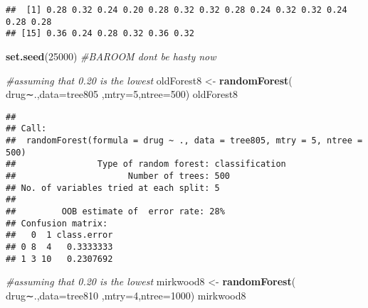 \documentclass[]{article}
\newenvironment{Shaded}{\begin{snugshade}}{\end{snugshade}}
\newcommand{\KeywordTok}[1]{\textcolor[rgb]{0.13,0.29,0.53}{\textbf{#1}}}
\newcommand{\DataTypeTok}[1]{\textcolor[rgb]{0.13,0.29,0.53}{#1}}
\newcommand{\DecValTok}[1]{\textcolor[rgb]{0.00,0.00,0.81}{#1}}
\newcommand{\StringTok}[1]{\textcolor[rgb]{0.31,0.60,0.02}{#1}}
\newcommand{\CommentTok}[1]{\textcolor[rgb]{0.56,0.35,0.01}{\textit{#1}}}
\newcommand{\ControlFlowTok}[1]{\textcolor[rgb]{0.13,0.29,0.53}{\textbf{#1}}}
\newcommand{\OperatorTok}[1]{\textcolor[rgb]{0.81,0.36,0.00}{\textbf{#1}}}
\newcommand{\NormalTok}[1]{#1}
\begin{document}
\begin{Shaded}
\end{Shaded}

\begin{verbatim}
##  [1] 0.28 0.32 0.24 0.20 0.28 0.32 0.32 0.28 0.24 0.32 0.32 0.24 0.28 0.28
## [15] 0.36 0.24 0.28 0.32 0.36 0.32
\end{verbatim}

\begin{Shaded}
\begin{Highlighting}[]
\KeywordTok{set.seed}\NormalTok{(}\DecValTok{25000}\NormalTok{)}
\CommentTok{#BAROOM dont be hasty now}

\CommentTok{#assuming that 0.20 is the lowest}
\NormalTok{oldForest8 <-}\StringTok{ }\KeywordTok{randomForest}\NormalTok{( drug∼.,}\DataTypeTok{data=}\NormalTok{tree805  ,}\DataTypeTok{mtry=}\DecValTok{5}\NormalTok{,}\DataTypeTok{ntree=}\DecValTok{500}\NormalTok{)}
\NormalTok{oldForest8}
\end{Highlighting}
\end{Shaded}

\begin{verbatim}
## 
## Call:
##  randomForest(formula = drug ~ ., data = tree805, mtry = 5, ntree = 500) 
##                Type of random forest: classification
##                      Number of trees: 500
## No. of variables tried at each split: 5
## 
##         OOB estimate of  error rate: 28%
## Confusion matrix:
##   0  1 class.error
## 0 8  4   0.3333333
## 1 3 10   0.2307692
\end{verbatim}

\begin{Shaded}
\begin{Highlighting}[]
\CommentTok{#assuming that 0.20 is the lowest}
\NormalTok{mirkwood8 <-}\StringTok{ }\KeywordTok{randomForest}\NormalTok{( drug∼.,}\DataTypeTok{data=}\NormalTok{tree810  ,}\DataTypeTok{mtry=}\DecValTok{4}\NormalTok{,}\DataTypeTok{ntree=}\DecValTok{1000}\NormalTok{)}
\NormalTok{mirkwood8}
\end{Highlighting}
\end{Shaded}
\end{document}
